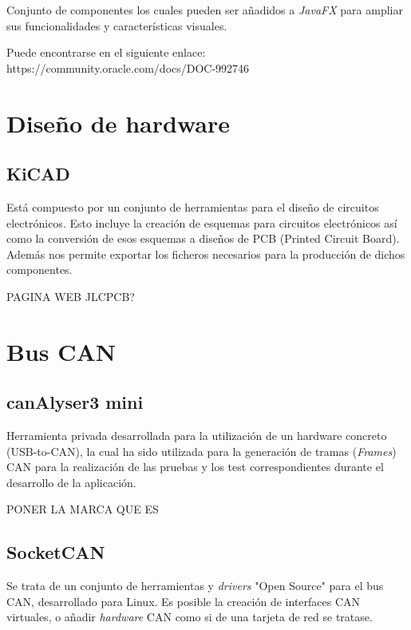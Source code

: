 Conjunto de componentes los cuales pueden ser añadidos a \emph{JavaFX} para ampliar sus funcionalidades y características visuales.

Puede encontrarse en el siguiente enlace: https://community.oracle.com/docs/DOC-992746


\section{Diseño de hardware}\label{diseño_de_hardware}

\subsection{KiCAD}\label{kicad}

Está compuesto por un conjunto de herramientas para el diseño de circuitos electrónicos. Esto incluye la creación de esquemas para circuitos electrónicos así como la conversión de esos esquemas a diseños de PCB (Printed Circuit Board). Además nos permite exportar los ficheros necesarios para la producción de dichos componentes.

PAGINA WEB JLCPCB?

\section{Bus CAN}\label{bus_can}

\subsection{canAlyser3 mini}\label{canalyser3_mini}

Herramienta privada desarrollada para la utilización de un hardware concreto (USB-to-CAN), la cual ha sido utilizada para la generación de tramas (\emph{Frames}) CAN para la realización de las pruebas y los test correspondientes durante el desarrollo de la aplicación.

PONER LA MARCA QUE ES

\subsection{SocketCAN}\label{socketcan}

Se trata de un conjunto de herramientas y \emph{drivers} "Open Source" para el bus CAN, desarrollado para Linux. Es posible la creación de interfaces CAN virtuales, o añadir \emph{hardware} CAN como si de una tarjeta de red se tratase.

